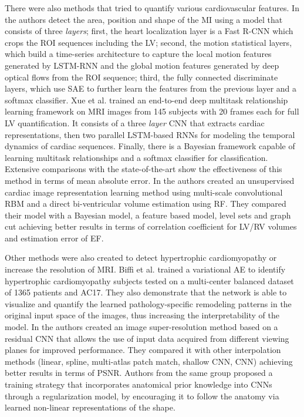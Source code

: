 \documentclass[journal]{IEEEtran}
\begin{document}
There were also methods that tried to quantify various cardiovascular features.
In\cite{xu2017direct} the authors detect the area, position and shape of the MI using a model that consists of three \textit{layers}; first, the heart localization layer is a Fast R-CNN\cite{girshick2015fast} which crops the ROI sequences including the LV; second, the motion statistical layers, which build a time-series architecture to capture the local motion features generated by LSTM-RNN and the global motion features generated by deep optical flows from the ROI sequence; third, the fully connected discriminate layers, which use SAE to further learn the features from the previous layer and a softmax classifier.
Xue et al.\cite{xue2018full} trained an end-to-end deep multitask relationship learning framework on MRI images from 145 subjects with 20 frames each for full LV quantification.
It consists of a three \textit{layer} CNN that extracts cardiac representations, then two parallel LSTM-based RNNs for modeling the temporal dynamics of cardiac sequences.
Finally, there is a Bayesian framework capable of learning multitask relationships and a softmax classifier for classification.
Extensive comparisons with the state-of-the-art show the effectiveness of this method in terms of mean absolute error.
In\cite{zhen2016multi} the authors created an unsupervised cardiac image representation learning method using multi-scale convolutional RBM and a direct bi-ventricular volume estimation using RF\@.
They compared their model with a Bayesian model, a feature based model, level sets and graph cut achieving better results in terms of correlation coefficient for LV/RV volumes and estimation error of EF\@.

Other methods were also created to detect hypertrophic cardiomyopathy or increase the resolution of MRI\@.
Biffi et al.\cite{biffi2018learning} trained a variational AE to identify hypertrophic cardiomyopathy subjects tested on a multi-center balanced dataset of 1365 patients and AC17.
They also demonstrate that the network is able to visualize and quantify the learned pathology-specific remodeling patterns in the original input space of the images, thus increasing the interpretability of the model.
In\cite{oktay2016multi} the authors created an image super-resolution method based on a residual CNN that allows the use of input data acquired from different viewing planes for improved performance.
They compared it with other interpolation methods (linear, spline, multi-atlas patch match, shallow CNN, CNN) achieving better results in terms of PSNR\@.
Authors from the same group proposed a training strategy\cite{oktay2018anatomically} that incorporates anatomical prior knowledge into CNNs through a regularization model, by encouraging it to follow the anatomy via learned non-linear representations of the shape.
\end{document}
